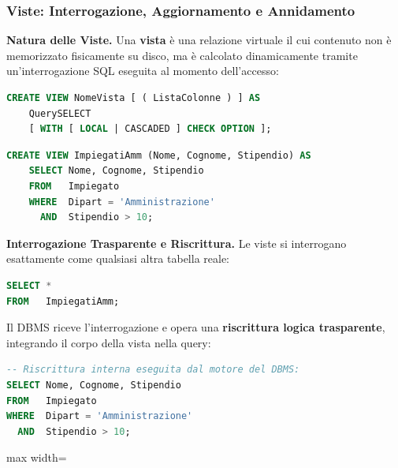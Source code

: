 \documentclass[12pt]{extarticle}
\begin{document}
\subsubsection{Viste: Interrogazione, Aggiornamento e Annidamento}
\noindent \textbf{Natura delle Viste.} Una \textbf{vista} è una relazione virtuale il cui contenuto non è memorizzato fisicamente su disco, ma è calcolato dinamicamente tramite un'interrogazione SQL eseguita al momento dell'accesso:
\begin{lstlisting}[language=SQL]
CREATE VIEW NomeVista [ ( ListaColonne ) ] AS
    QuerySELECT
    [ WITH [ LOCAL | CASCADED ] CHECK OPTION ];
\end{lstlisting}

\begin{lstlisting}[language=SQL, caption={Creazione di una vista filtrata}]
CREATE VIEW ImpiegatiAmm (Nome, Cognome, Stipendio) AS
    SELECT Nome, Cognome, Stipendio
    FROM   Impiegato
    WHERE  Dipart = 'Amministrazione'
      AND  Stipendio > 10;
\end{lstlisting}

\medskip
\noindent \textbf{Interrogazione Trasparente e Riscrittura.} Le viste si interrogano esattamente come qualsiasi altra tabella reale:
\begin{lstlisting}[language=SQL]
SELECT * 
FROM   ImpiegatiAmm;
\end{lstlisting}
Il DBMS riceve l'interrogazione e opera una \textbf{riscrittura logica trasparente}, integrando il corpo della vista nella query:
\begin{lstlisting}[language=SQL]
-- Riscrittura interna eseguita dal motore del DBMS:
SELECT Nome, Cognome, Stipendio
FROM   Impiegato
WHERE  Dipart = 'Amministrazione' 
  AND  Stipendio > 10;
\end{lstlisting}

\begin{center}
\begin{adjustbox}{max width=\linewidth}
\end{adjustbox}
\end{center}
\end{document}
